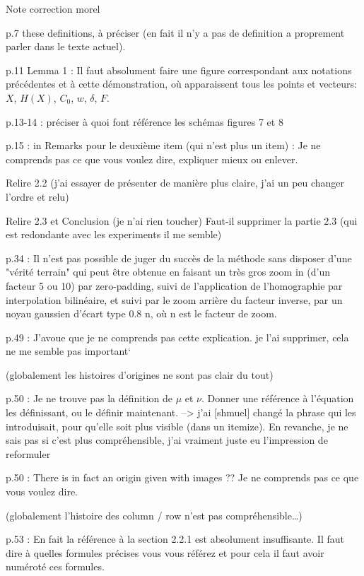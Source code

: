 Note correction morel

p.7 these definitions, à préciser (en fait il n’y a pas de definition a proprement parler dans le texte actuel).

p.11 Lemma 1 :  Il faut absolument faire une figure correspondant aux notations précédentes et à cette démonstration, où apparaissent tous  les points et vecteurs: $X$, $H(X)$, $C_0$, $w$, $\delta$, $F$.

p.13-14 : préciser à quoi font référence les schémas figures 7 et 8

p.15 : in Remarks pour le deuxième item (qui n’est plus un item) :  Je ne comprends pas ce que vous voulez dire, expliquer mieux ou enlever.

Relire 2.2 (j’ai essayer de présenter de manière plus claire, j’ai un peu changer l’ordre et relu)

Relire 2.3 et Conclusion (je n’ai rien toucher) 
Faut-il supprimer la partie 2.3 (qui est redondante avec les experiments il me semble)

p.34 : Il n'est pas possible de juger du succès de la méthode sans disposer d'une "vérité terrain" qui peut être obtenue en faisant un très gros zoom in (d'un facteur 5 ou 10) par zero-padding, suivi de l'application de l'homographie par interpolation bilinéaire, et suivi par le zoom arrière du facteur inverse, par un noyau gaussien d'écart type 0.8 n, où n est  le facteur de zoom.

p.49 : J'avoue que je ne comprends pas cette explication. 
je l’ai supprimer, cela ne me semble pas important`

(globalement les histoires d’origines ne sont pas clair du tout)

p.50 : Je ne trouve pas la définition de $\mu$ et $\nu$. Donner une référence à l'équation les définissant, ou le définir maintenant.
--> j'ai [shmuel] changé la phrase qui les introduisait, pour qu'elle soit plus visible (dans un itemize). En revanche, je ne sais pas si c'est plus compréhensible, j'ai vraiment juste eu l'impression de reformuler

p.50 : There is in fact an origin given with images ?? Je ne comprends pas ce que vous voulez dire.

(globalement l’histoire des column / row n’est pas compréhensible…)

p.53 : En fait la référence à la section 2.2.1 est absolument insuffisante. Il faut dire à quelles formules précises vous vous référez et pour cela il faut avoir numéroté ces formules.
